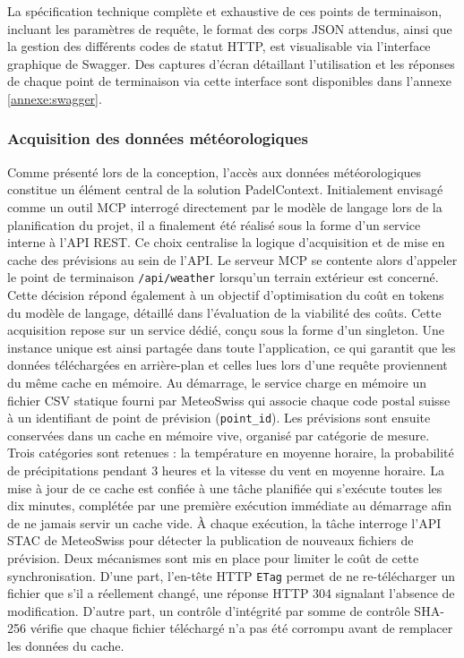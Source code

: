 \documentclass[12pt]{article}
\begin{document}
La spécification technique complète et exhaustive de ces points de terminaison, incluant les paramètres de requête, le format des corps JSON attendus, ainsi que la gestion des différents codes de statut HTTP, est visualisable via l'interface graphique de Swagger. 
\newline\newline
Des captures d'écran détaillant l'utilisation et les réponses de chaque point de terminaison via cette interface sont disponibles dans l'annexe \ref{annexe:swagger}.
\subsubsection{Acquisition des données météorologiques}

Comme présenté lors de la conception, l'accès aux données météorologiques constitue un élément central de la solution PadelContext. Initialement envisagé comme un outil MCP interrogé directement par le modèle de langage lors de la planification du projet, il a finalement été réalisé sous la forme d'un service interne à l'API REST. Ce choix centralise la logique d'acquisition et de mise en cache des prévisions au sein de l'API. Le serveur MCP se contente alors d'appeler le point de terminaison \texttt{/api/weather} lorsqu'un terrain extérieur est concerné. Cette décision répond également à un objectif d'optimisation du coût en tokens du modèle de langage, détaillé dans l'évaluation de la viabilité des coûts.
\newline\newline
Cette acquisition repose sur un service dédié, conçu sous la forme d'un singleton. Une instance unique est ainsi partagée dans toute l'application, ce qui garantit que les données téléchargées en arrière-plan et celles lues lors d'une requête proviennent du même cache en mémoire. Au démarrage, le service charge en mémoire un fichier CSV statique fourni par MeteoSwiss qui associe chaque code postal suisse à un identifiant de point de prévision (\texttt{point\_id}). Les prévisions sont ensuite conservées dans un cache en mémoire vive, organisé par catégorie de mesure. Trois catégories sont retenues : la température en moyenne horaire, la probabilité de précipitations pendant 3 heures et la vitesse du vent en moyenne horaire.
\newline\newline
La mise à jour de ce cache est confiée à une tâche planifiée qui s'exécute toutes les dix minutes, complétée par une première exécution immédiate au démarrage afin de ne jamais servir un cache vide. À chaque exécution, la tâche interroge l'API STAC de MeteoSwiss pour détecter la publication de nouveaux fichiers de prévision. Deux mécanismes sont mis en place pour limiter le coût de cette synchronisation. D'une part, l'en-tête HTTP \texttt{ETag} permet de ne re-télécharger un fichier que s'il a réellement changé, une réponse HTTP 304 signalant l'absence de modification. D'autre part, un contrôle d'intégrité par somme de contrôle SHA-256 vérifie que chaque fichier téléchargé n'a pas été corrompu avant de remplacer les données du cache.
\end{document}
